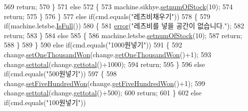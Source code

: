 \begin{DoxyCode}
569                 \textcolor{keywordflow}{return};
570             \}
571             \textcolor{keywordflow}{else}
572             \{
573                 machine.sikhye.\hyperlink{class_vending_machine_1_1_product_a09bbd37ae2e203492a3ca553adf3a8fc}{setnumOfStock}(10);
574                 \textcolor{keywordflow}{return};
575             \}
576         \}
577         \textcolor{keywordflow}{else} \textcolor{keywordflow}{if}(cmd.equals(\textcolor{stringliteral}{"레츠비채우기"}))
578         \{
579             \textcolor{keywordflow}{if}(machine.letsbe.\hyperlink{class_vending_machine_1_1_product_ac21e8cb627fddac1d392a765348c630e}{IsFull}())
580             \{
581                 \hyperlink{class_vending_machine_1_1_machine_u_i_a737e9b912652fdd8ed7824f12992d1bf}{error}(\textcolor{stringliteral}{"레츠비를 넣을 공간이 없습니다."});
582                 \textcolor{keywordflow}{return};
583             \}
584             \textcolor{keywordflow}{else}
585             \{
586                 machine.letsbe.\hyperlink{class_vending_machine_1_1_product_a09bbd37ae2e203492a3ca553adf3a8fc}{setnumOfStock}(10);
587                 \textcolor{keywordflow}{return};
588             \}
589         \}
590         \textcolor{keywordflow}{else} \textcolor{keywordflow}{if}(cmd.equals(\textcolor{stringliteral}{"1000원넣기"}))
591         \{
592             change.\hyperlink{class_vending_machine_1_1_change_a31d951e1dcdab0d4cbbc4e76219608ae}{setOneThousandWon}(change.\hyperlink{class_vending_machine_1_1_change_a4207ff32f227afb89076b87a3812cf2e}{getOneThousandWon}()+1);
593             change.\hyperlink{class_vending_machine_1_1_change_a400cce1d214d8e70ae8018aaaa8b1794}{settotal}(change.\hyperlink{class_vending_machine_1_1_change_a07a32d7240178343fa1273d075d73c64}{gettotal}()+1000);
594             \textcolor{keywordflow}{return};
595         \}
596         \textcolor{keywordflow}{else} \textcolor{keywordflow}{if}(cmd.equals(\textcolor{stringliteral}{"500원넣기"}))
597         \{
598             change.\hyperlink{class_vending_machine_1_1_change_ae5dab6be91f68fc364f004649568deb8}{setFiveHundredWon}(change.\hyperlink{class_vending_machine_1_1_change_afa26632165b427a19133f182996587a3}{getFiveHundredWon}()+1);
599             change.\hyperlink{class_vending_machine_1_1_change_a400cce1d214d8e70ae8018aaaa8b1794}{settotal}(change.\hyperlink{class_vending_machine_1_1_change_a07a32d7240178343fa1273d075d73c64}{gettotal}()+500);
600             \textcolor{keywordflow}{return};
601         \}
602         \textcolor{keywordflow}{else} \textcolor{keywordflow}{if}(cmd.equals(\textcolor{stringliteral}{"100원넣기"}))

\end{DoxyCode}

